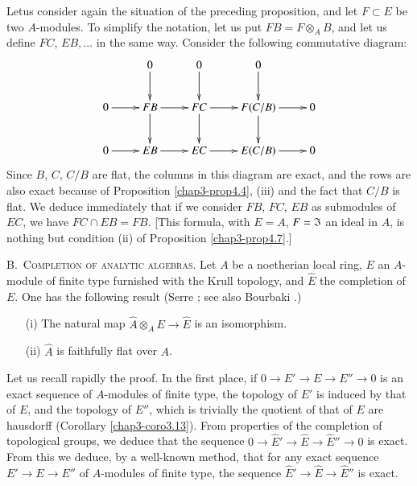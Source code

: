\begin{remark}\label{chap3-rem4.8}
Let\pageoriginale us consider again the situation of the preceding proposition, and let $F\subset E$ be two $A$-modules. To simplify the notation, let us put $FB=F\otimes_{A}B$, and let us define $FC$, $EB,\ldots$ in the same way. Consider the following commutative diagram:
\[
\xymatrix{
 & 0\ar[d] & 0\ar[d] & 0\ar[d] & \\
0\ar[r] & FB\ar[d]\ar[r] & FC\ar[d]\ar[r] & F(C/B)\ar[d]\ar[r] & 0\\
0\ar[r] & EB\ar[r] & EC\ar[r] & E(C/B)\ar[r] & 0
}
\]
Since $B$, $C$, $C/B$ are flat, the columns in this diagram are exact, and the rows are also exact because of Proposition \ref{chap3-prop4.4}, (iii) and the fact that $C/B$ is flat. We deduce immediately that if we consider $FB$, $FC$, $EB$ as submodules of $EC$, we have $FC\cap EB=FB$. [This formula, with $E=A$, $F=\mathfrak{I}$ an ideal in $A$, is nothing but condition (ii) of Proposition \ref{chap3-prop4.7}.]
\end{remark}

\noindent
B.~\textsc{Completion of analytic algebras.} Let $A$ be a noetherian local ring, $E$ an $A$-module of finite type furnished with the Krull topology, and $\widehat{E}$ the completion of $E$. One has the following result (Serre \cite{J. P. Serre : 1}; see also Bourbaki \cite{N. Bourbaki: 1}.)

\begin{theorem}\label{chap3-thm4.9}
\begin{itemize}
\item[\rm(i)] The natural map $\widehat{A}\otimes_{A}E\to \widehat{E}$ is an isomorphism.

\item[\rm(ii)] $\widehat{A}$ is faithfully flat over $A$.
\end{itemize}
\end{theorem}

Let us recall rapidly the proof. In the first place, if $0\to E'\to E\to E''\to 0$ is an exact sequence of $A$-modules of finite type, the topology of $E'$ is induced by that of $E$, and the topology of $E''$, which is trivially the quotient of that of $E$ are hausdorff (Corollary \ref{chap3-coro3.13}). From properties of the completion of topological groups, we deduce that the sequence $0\to \widehat{E}'\to \widehat{E}\to \widehat{E}''\to 0$ is exact. From this we deduce, by a well-known method, that for any exact sequence $E'\to E\to E''$ of $A$-modules of finite type, the sequence $\widehat{E}'\to \widehat{E}\to \widehat{E}''$ is exact.

